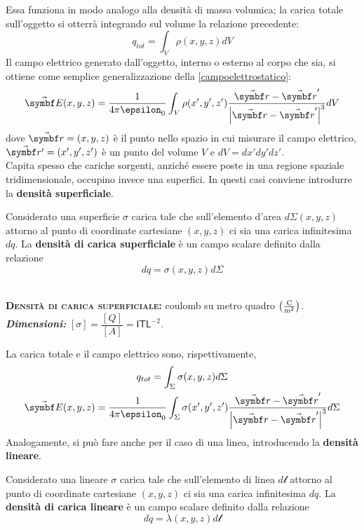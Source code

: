 Essa funziona in modo analogo alla densità di massa volumica; la carica totale sull'oggetto si otterrà integrando sul volume la relazione precedente:
\begin{equation}
	q_{tot}=\int_V\rho(x,y,z)dV
\end{equation}
Il campo elettrico generato dall'oggetto, interno o esterno al corpo che sia, si ottiene come semplice generalizzazione della \ref{campoelettrostatico}:
\begin{equation}
	\vba{E}(x,y,z)=\frac{1}{4\pi\epsilon_0}\int_V\rho(x',y',z')\frac{\vba{r}-\vba{r}'}{\abs{\vba{r}-\vba{r}'}^3}dV
\end{equation}
dove $\vba{r}=(x,y,z)$ è il punto nello spazio in cui misurare il campo elettrico, $\vba{r'}=(x',y',z')$ è un punto del volume $V$ e $dV=dx'dy'dz'$.\\
Capita spesso che cariche sorgenti, anziché essere poste in una regione spaziale tridimensionale, occupino invece una superfici. In questi casi conviene introdurre la \textbf{densità superficiale}.
 \begin{define}
 	Considerato una superficie $\sigma$ carica tale che sull'elemento d'area $d\Sigma(x,y,z)$ attorno al punto di coordinate cartesiane $(x,y,z)$ ci sia una carica infinitesima $dq$. La \textbf{densità di carica superficiale} è un campo scalare definito dalla relazione
 	\begin{equation}
 		dq=\sigma(x,y,z)d\Sigma
 	\end{equation}
 \end{define}

\begin{units}~\\
	\textbf{\textsc{Densità di carica superficiale:}} coulomb su metro quadro $\left(\unit[per-mode = fraction]{\coulomb\per\square\meter}\right)$.\\
	\textit{\textbf{Dimensioni:}} $[\sigma]=\dfrac{[Q]}{[A]}=\mathsf{I}\mathsf{T}\mathsf{L}^{-2}$.
\end{units}
La carica totale e il campo elettrico sono, rispettivamente,
\begin{gather}
		q_{tot}=\int_\Sigma\sigma(x,y,z)d\Sigma\\
		\vba{E}(x,y,z)=\frac{1}{4\pi\epsilon_0}\int_\Sigma\sigma(x',y',z')\frac{\vba{r}-\vba{r}'}{\abs{\vba{r}-\vba{r}'}^3}d\Sigma
\end{gather}
Analogamente, si può fare anche per il caso di una linea, introducendo la \textbf{densità lineare}.
\begin{define}
	Considerato una lineare $\sigma$ carica tale che sull'elemento di linea $d\mathcal{l}$ attorno al punto di coordinate cartesiane $(x,y,z)$ ci sia una carica infinitesima $dq$. La \textbf{densità di carica lineare} è un campo scalare definito dalla relazione
	\begin{equation}
		dq=\lambda(x,y,z)d\mathcal{l}
	\end{equation}
\end{define}


